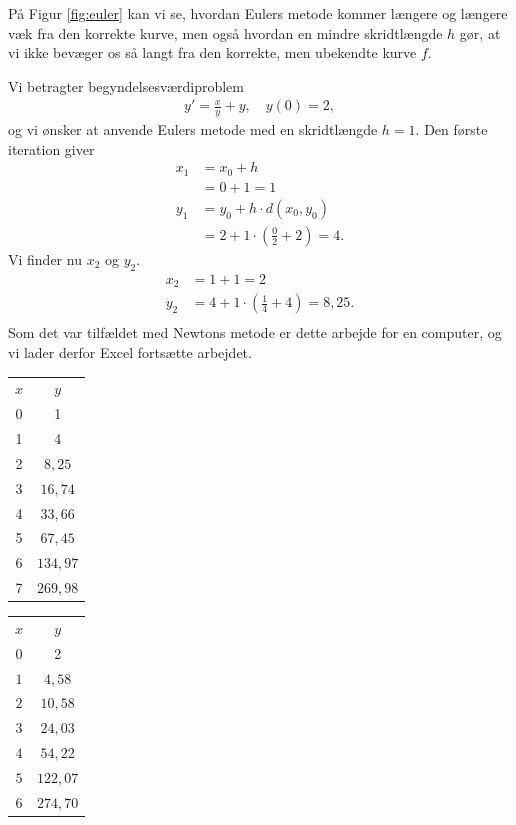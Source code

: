 På Figur \ref{fig:euler} kan vi se, hvordan Eulers metode kommer længere og længere væk fra den korrekte kurve, men også hvordan en mindre skridtlængde $h$ gør, at vi ikke bevæger os så langt fra den korrekte, men ubekendte kurve $f$. 
\begin{exa}
	Vi betragter begyndelsesværdiproblem 
	\begin{align*}
		y' =  \frac{x}{y} + y, \quad y(0) = 2, 
	\end{align*}
	og vi ønsker at anvende Eulers metode med en skridtlængde $h = 1$.
	Den første iteration giver
	\begin{align*}
		x_1 &= x_0 + h \\
		&= 0 + 1 = 1\\
		y_1 &= y_0 + h \cdot d(x_0,y_0) \\
		&= 2 + 1\cdot \left(\frac{0}{2} + 2\right) = 4.
	\end{align*}
	Vi finder nu $x_2$ og $y_2$.
	\begin{align*}
		x_2 &= 1 + 1 = 2 \\
		y_2 &= 4 + 1\cdot \left(\frac{1}{4} + 4 \right) = 8,\! 25. \\
	\end{align*}
	Som det var tilfældet med Newtons metode er dette arbejde for en computer, og vi lader derfor Excel fortsætte arbejdet.
	\begin{table}[H]
		\centering
		\begin{tabular}{cc}
			$x$ & $y$ \\
			0 & 1 \\
			1 & 4 \\
			2 & $8,\!25$ \\
			3 & $16,\!74$ \\
			4 & $33,\!66$ \\
			5 & $67,\!45$ \\
			6 & $134,\!97$ \\
			7 & $269,\!98$ \\
		\end{tabular}	
		\begin{tabular}{cc}
			$x$ & $y$ \\
			0 &	2 \\
			$1$	 & $4,\!58$ \\
			$2$ &	$10,\!58$ \\
			$3$ &	$24,\!03$ \\
			$4$ &	$54,\!22$\\
			$5$ & 	$122,\!07$ \\	
			$6$	 & $274,\!70$ \\

\end{tabular}
\end{table}
\end{exa}
